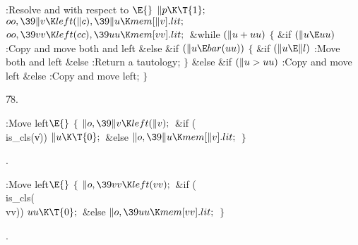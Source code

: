 \Y\B\4:Resolve  and  with respect to \X${}\E{}$\6
$\|p\K\T{1};{}$\6
${}\\{oo},\39\|v\K\\{left}(\|c),\39\|u\K\\{mem}[\|v].\\{lit};{}$\6
${}\\{oo},\39\\{vv}\K\\{left}(\\{cc}),\39\\{uu}\K\\{mem}[\\{vv}].\\{lit};{}$\6
\&{while} ${}(\|u+\\{uu}){}$\5
${}\{{}$\1\6
\&{if} ${}(\|u\E\\{uu}){}$\1\5
:Copy  and move both  and  left\X\2\6
\&{else} \&{if} ${}(\|u\E\\{bar}(\\{uu})){}$\5
${}\{{}$\1\6
\&{if} ${}(\|u\E\|l){}$\1\5
:Move both  and  left\X\2\6
\&{else}\1\5
:Return a tautology\X;\2\6
\4${}\}{}$\5
\2\&{else} \&{if} ${}(\|u>\\{uu}){}$\1\5
:Copy  and move  left\X\2\6
\&{else}\1\5
:Copy  and move  left\X;\2\6
\4${}\}{}$\2\par
\U78.\fi

\B{}:Move  left\X${}\E{}$\6
${}\{{}$\1\6
${}\|o,\39\|v\K\\{left}(\|v);{}$\6
\&{if} (\\{is\_cls}(\|v))\1\5
${}\|u\K\T{0};{}$\2\6
\&{else}\1\5
${}\|o,\39\|u\K\\{mem}[\|v].\\{lit};{}$\2\6
\4${}\}{}$\2\par
{}.\fi

\B{}:Move  left\X${}\E{}$\6
${}\{{}$\1\6
${}\|o,\39\\{vv}\K\\{left}(\\{vv});{}$\6
\&{if} (\\{is\_cls}(\\{vv}))\1\5
${}\\{uu}\K\T{0};{}$\2\6
\&{else}\1\5
${}\|o,\39\\{uu}\K\\{mem}[\\{vv}].\\{lit};{}$\2\6
\4${}\}{}$\2\par
{}.\fi

